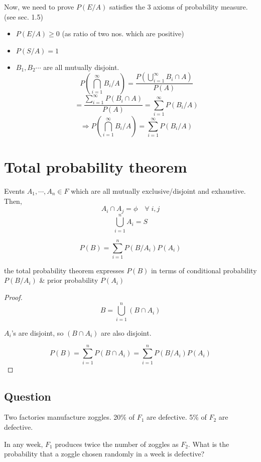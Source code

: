 \documentclass{article}
\begin{document}
\begin{itemize}
    Now, we need to prove $ P(E/A)$  satisfies the 3 axioms of probability measure.(see sec. 1.5)
    \begin{itemize}
        \item $ P(E/A) \geq 0$ (as ratio of two nos. which are positive)
        \item $ P(S/A)=1$
        \item $ B_1, B_2 \cdots$ are all mutually disjoint.
        $$ P(\bigcap_{i=1}^{\infty} B_i /A) = \frac{ P(\bigcup_{i=1}^{\infty} B_i \cap A)}{P(A)}$$
        $$ =\frac{\sum_{i=1}^{\infty} P(B_i \cap A)}{P(A)} = \sum_{i=1}^{\infty} P(B_i /A)$$
        $$  \Rightarrow P(\bigcap_{i=1}^{\infty} B_i /A) = \sum_{i=1}^{\infty} P(B_i /A)$$
    \end{itemize}
\end{itemize}





\section{Total probability theorem}

Events $A_1,\cdots, A_n \in F$ which are all mutually exclusive/disjoint and exhaustive. Then,
$$ A_i \cap A_j = \phi \quad \forall\; i,j$$
$$ \bigcup_{i=1}^{n} A_i =S$$

$$ P(B)= \sum_{i=1}^{n} P(B/A_i)P(A_i)$$

the total probability theorem expresses $ P(B)$  in terms of conditional probability $ P(B/A_i) $ \& prior probability $P(A_i)$
\begin{proof}

    $$ B= \bigcup_{i=1}^{n} (B \cap A_i)$$

    $A_i$'s are disjoint, so $(B \cap A_i)$ are also disjoint.

    $$ P(B)= \sum_{i=1}^{n} P(B \cap A_i)=\sum_{i=1}^{n} P(B / A_i)P(A_i)$$


\end{proof}

\subsection{Question}
Two factories manufacture zoggles. 20\% of $F_1$ are defective. 5\% of $F_2$ are defective.

In any week, $F_1$ produces twice the number of zoggles as $F_2$. What is the probability that a zoggle chosen randomly in a week is defective?
\end{document}
